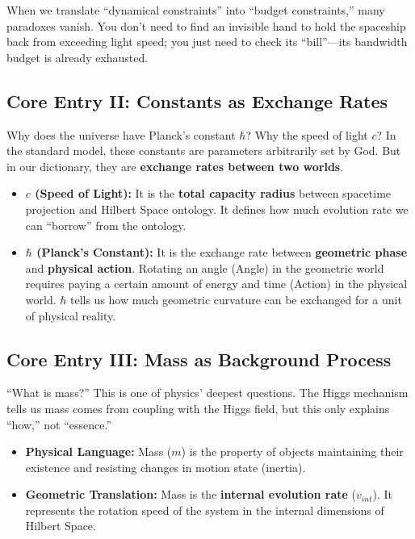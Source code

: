 \documentclass[11pt,a4paper,twoside]{book}
\begin{document}
When we translate ``dynamical constraints'' into ``budget constraints,'' many paradoxes vanish. You don't need to find an invisible hand to hold the spaceship back from exceeding light speed; you just need to check its ``bill''---its bandwidth budget is already exhausted.

\subsection{Core Entry II: Constants as Exchange Rates}

Why does the universe have Planck's constant $\hbar$? Why the speed of light $c$? In the standard model, these constants are parameters arbitrarily set by God. But in our dictionary, they are \textbf{exchange rates between two worlds}.

\begin{itemize}
\item \textbf{$c$ (Speed of Light):} It is the \textbf{total capacity radius} between spacetime projection and Hilbert Space ontology. It defines how much evolution rate we can ``borrow'' from the ontology.

\item \textbf{$\hbar$ (Planck's Constant):} It is the exchange rate between \textbf{geometric phase} and \textbf{physical action}. Rotating an angle (Angle) in the geometric world requires paying a certain amount of energy and time (Action) in the physical world. $\hbar$ tells us how much geometric curvature can be exchanged for a unit of physical reality.
\end{itemize}

\subsection{Core Entry III: Mass as Background Process}

``What is mass?'' This is one of physics' deepest questions. The Higgs mechanism tells us mass comes from coupling with the Higgs field, but this only explains ``how,'' not ``essence.''

\begin{itemize}
\item \textbf{Physical Language:} Mass ($m$) is the property of objects maintaining their existence and resisting changes in motion state (inertia).

\item \textbf{Geometric Translation:} Mass is the \textbf{internal evolution rate} ($v_{int}$). It represents the rotation speed of the system in the internal dimensions of Hilbert Space.
\end{itemize}
\end{document}
